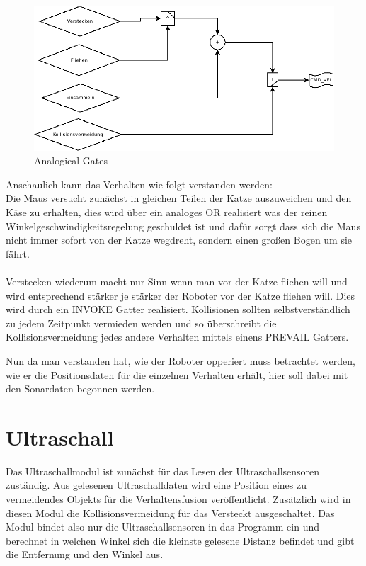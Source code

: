 \documentclass[11pt,a4paper]{article}
\begin{document}
\begin{figure}[H]
\centering
\includegraphics[scale=0.5]{media/gates.png}
\caption{Analogical Gates}\label{gates}
\end{figure}
Anschaulich kann das Verhalten wie folgt verstanden werden:\\
Die Maus versucht zunächst in gleichen Teilen der Katze auszuweichen und den Käse zu erhalten, dies wird über ein analoges OR realisiert was der reinen Winkelgeschwindigkeitsregelung geschuldet ist und dafür sorgt dass sich die Maus nicht immer sofort von der Katze wegdreht, sondern einen großen Bogen um sie fährt.\\
\\
Verstecken wiederum macht nur Sinn wenn man vor der Katze fliehen will und wird entsprechend stärker je stärker der Roboter vor der Katze fliehen will.
Dies wird durch ein INVOKE Gatter realisiert.
Kollisionen sollten selbstverständlich zu jedem Zeitpunkt vermieden werden und so überschreibt die Kollisionsvermeidung jedes andere Verhalten mittels einens PREVAIL Gatters.

Nun da man verstanden hat, wie der Roboter opperiert muss betrachtet werden, wie er die Positionsdaten für die einzelnen Verhalten erhält, hier soll dabei mit den Sonardaten begonnen werden.
\section{Ultraschall}
Das Ultraschallmodul ist zunächst für das Lesen der Ultraschallsensoren zuständig. Aus gelesenen Ultraschalldaten wird eine Position eines zu vermeidendes Objekts für die Verhaltensfusion veröffentlicht. Zusätzlich wird in diesen Modul die Kollisionsvermeidung für das Versteckt ausgeschaltet. Das Modul bindet also nur die Ultraschallsensoren in das Programm ein und berechnet in welchen Winkel sich die kleinste gelesene Distanz befindet und gibt die Entfernung und den Winkel aus. 
\end{document}
